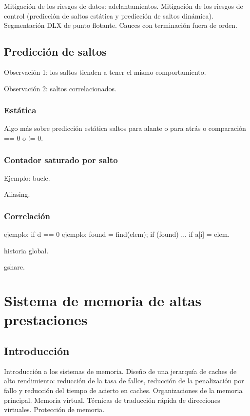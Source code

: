 \documentclass[12pt,onecolumn]{memoir}
\begin{document}
Mitigación de los riesgos de datos: adelantamientos. Mitigación de los riesgos de control (predicción de saltos estática y predicción de saltos dinámica). Segmentación DLX de punto flotante. Cauces con terminación fuera de orden.

\section{Predicción de saltos}

Observación 1: los saltos tienden a tener el mismo comportamiento.

Observación 2: saltos correlacionados.

\subsection{Estática}

Algo más sobre predicción estática saltos para alante o para atrás o comparación == 0 o != 0.

\subsection{Contador saturado por salto}

Ejemplo: bucle.

Aliasing.

\subsection{Correlación}

ejemplo: if d == 0
ejemplo: found = find(elem); if (found) ...  if a[i] = elem.

historia global.

gshare.


\chapter{Sistema de memoria de altas prestaciones}
\label{cap:memoria}


\section{Introducción}
\label{sec:introduccion_memoria}

Introducción a los sistemas de memoria. Diseño de una jerarquía de caches de alto rendimiento: reducción de la tasa de fallos,  reducción de la penalización por fallo y reducción del tiempo de acierto en caches. Organizaciones de la memoria principal. Memoria virtual. Técnicas de traducción rápida de direcciones virtuales. Protección de memoria.
\end{document}
